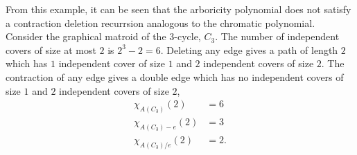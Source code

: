 \documentclass[12pt,reqno]{amsart}
\numberwithin{definition}{section}
\theoremstyle{definition}
\newtheorem{example}[definition]{Example}
\begin{document}
From this example, it can be seen that the arboricity polynomial does
not satisfy a contraction deletion recurrsion analogous to the chromatic polynomial.  Consider the graphical matroid of the $3$-cycle, $C_3$.  The number of independent covers of size at most $2$ is $2^3-2 = 6$.    Deleting any edge gives a path of length $2$ which has $1$ independent cover of size $1$ and $2$ independent covers of size $2$.  The contraction of any edge gives a double edge which has no independent covers of size $1$ and $2$ independent covers of size $2$,  
\begin{align*}
\chi_{A(C_3)}(2) &= 6 \\
\chi_{A(C_3)-e}(2) &= 3 \\
\chi_{A(C_3) / e }(2)  &= 2.
\end{align*}









\end{document}
